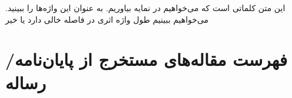 \documentclass[msc,draftmode]{AlzahraThesis}
\begin{document}
\begin{spacing}{1.5}

\tableofcontents
\IncludeNotationPage{

}

\listoftables
\newpage
\listoffigures
\newpage
\end{spacing}


\pagestyle{fancy}
\IncludePrefacePage{

}



این متن 
کلماتی است که می‌خواهیم در نمایه بیاوریم. به عنوان
این واژه‌ها را ببینید.
می‌خواهیم ببینیم طول واژه اثری در فاصله
 خالی دارد یا خیر

%
%

%




\pagestyle{empty}

\appendixMode








\newpage
\section*{فهرست مقاله‌های مستخرج از پایان‌نامه/رساله}
\end{document}

